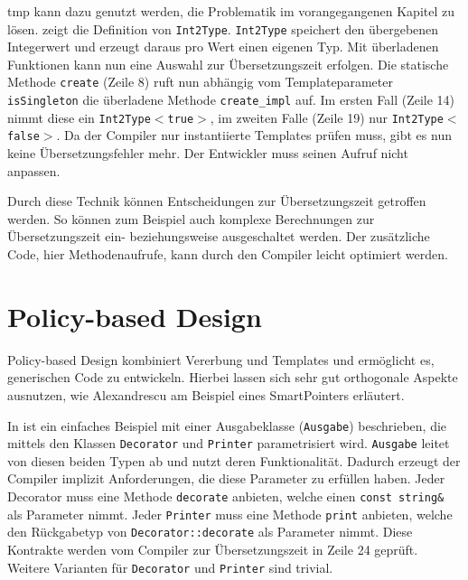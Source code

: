 \ac{tmp} kann dazu genutzt werden, die Problematik im vorangegangenen Kapitel zu lösen.  zeigt die Definition von \texttt{Int2Type}. \texttt{Int2Type} speichert den übergebenen Integerwert und erzeugt daraus pro Wert einen eigenen Typ. Mit überladenen Funktionen kann nun eine Auswahl zur Übersetzungszeit erfolgen. Die statische Methode \texttt{create} (Zeile 8) ruft nun abhängig vom Templateparameter \texttt{isSingleton} die überladene Methode \texttt{create\_impl} auf. Im ersten Fall (Zeile 14) nimmt diese ein \texttt{Int2Type$<$true$>$}, im zweiten Falle (Zeile 19) nur \texttt{Int2Type$<$false$>$}. Da der Compiler nur instantiierte Templates prüfen muss, gibt es nun keine Übersetzungsfehler mehr. Der Entwickler muss seinen Aufruf nicht anpassen.



Durch diese Technik können Entscheidungen zur Übersetzungszeit getroffen werden. So können zum Beispiel auch komplexe Berechnungen zur Übersetzungszeit ein- beziehungsweise ausgeschaltet werden. Der zusätzliche Code, hier Methodenaufrufe, kann durch den Compiler leicht optimiert werden.

\section{Policy-based Design}
Policy-based Design kombiniert Vererbung und Templates und ermöglicht es, generischen Code zu entwickeln. Hierbei lassen sich sehr gut orthogonale Aspekte ausnutzen, wie Alexandrescu am Beispiel eines SmartPointers erläutert.

In  ist ein einfaches Beispiel mit einer Ausgabeklasse (\texttt{Ausgabe}) beschrieben, die mittels den Klassen \texttt{Decorator} und \texttt{Printer} parametrisiert wird. \texttt{Ausgabe} leitet von diesen beiden Typen ab und nutzt deren Funktionalität. Dadurch erzeugt der Compiler implizit Anforderungen, die diese Parameter zu erfüllen haben. Jeder Decorator muss eine Methode \texttt{decorate} anbieten, welche einen \texttt{const string\&} als Parameter nimmt. Jeder \texttt{Printer} muss eine Methode \texttt{print} anbieten, welche den Rückgabetyp von \texttt{Decorator::decorate} als Parameter nimmt. Diese Kontrakte werden vom Compiler zur Übersetzungszeit in Zeile 24 geprüft. Weitere Varianten für \texttt{Decorator} und \texttt{Printer} sind trivial.

